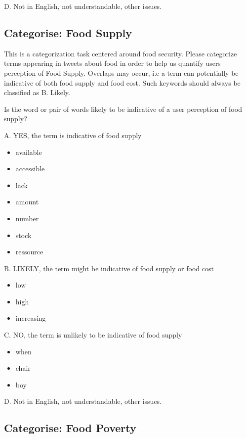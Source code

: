 D. Not in English, not understandable, other issues.


\subsection{Categorise: Food Supply}

This is a categorization task centered around food security. Please categorize terms appearing in tweets about food in order to help us quantify users perception of Food Supply. Overlaps may occur, i.e a term can potentially be indicative of both food supply and food cost. Such keywords should always be classified as B. Likely.

Is the word or pair of words likely to be indicative of a user perception of food supply?


A. YES, the term is indicative of food supply


\begin{itemize}
  \item available 
  \item accessible 
    \item lack 
  \item amount 
  \item number 
   \item stock 
   \item ressource 
\end{itemize}

B. LIKELY, the term might be indicative of food supply or food cost
\begin{itemize}
  \item low
  \item high 
  \item increasing  
\end{itemize}

C. NO, the term is unlikely to be indicative of food supply 
\begin{itemize}
  \item when
  \item chair
  \item boy
\end{itemize}

D. Not in English, not understandable, other issues.



\subsection{Categorise: Food Poverty}

